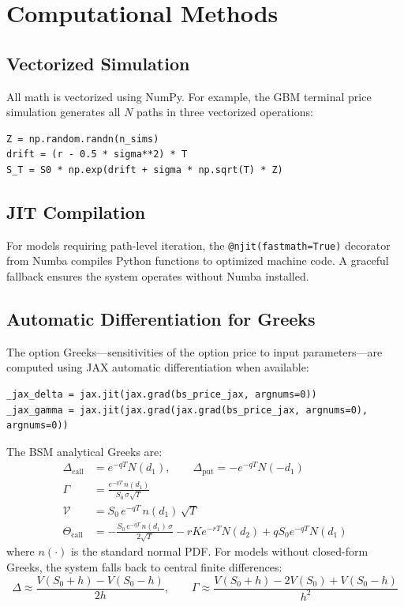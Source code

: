 \documentclass[12pt,a4paper]{article}
\begin{document}
\section{Computational Methods}

\subsection{Vectorized Simulation}

All math is vectorized using NumPy. For example, the GBM terminal price simulation generates all $N$ paths in three vectorized operations:
\begin{lstlisting}
Z = np.random.randn(n_sims)
drift = (r - 0.5 * sigma**2) * T
S_T = S0 * np.exp(drift + sigma * np.sqrt(T) * Z)
\end{lstlisting}

\subsection{JIT Compilation}

For models requiring path-level iteration, the \texttt{@njit(fastmath=True)} decorator from Numba compiles Python functions to optimized machine code. A graceful fallback ensures the system operates without Numba installed.

\subsection{Automatic Differentiation for Greeks}

The option Greeks---sensitivities of the option price to input parameters---are computed using JAX automatic differentiation when available:
\begin{lstlisting}
_jax_delta = jax.jit(jax.grad(bs_price_jax, argnums=0))
_jax_gamma = jax.jit(jax.grad(jax.grad(bs_price_jax, argnums=0), argnums=0))
\end{lstlisting}

The BSM analytical Greeks are:
\begin{align}
\Delta_{\text{call}} &= e^{-qT}N(d_1), \qquad \Delta_{\text{put}} = -e^{-qT}N(-d_1) \label{eq:delta}\\
\Gamma &= \frac{e^{-qT}\,n(d_1)}{S_0\,\sigma\sqrt{T}} \label{eq:gamma}\\
\mathcal{V} &= S_0\,e^{-qT}\,n(d_1)\,\sqrt{T} \label{eq:vega}\\
\Theta_{\text{call}} &= -\frac{S_0\,e^{-qT}\,n(d_1)\,\sigma}{2\sqrt{T}} - rKe^{-rT}N(d_2) + qS_0 e^{-qT}N(d_1) \label{eq:theta}
\end{align}
where $n(\cdot)$ is the standard normal PDF. For models without closed-form Greeks, the system falls back to central finite differences:
\begin{equation}
\Delta \approx \frac{V(S_0 + h) - V(S_0 - h)}{2h}, \qquad \Gamma \approx \frac{V(S_0 + h) - 2V(S_0) + V(S_0 - h)}{h^2}
\end{equation}
\end{document}
